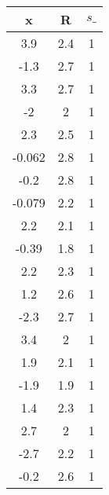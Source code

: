 \begin{tiny}\begin{tabular}{|c|c|c|}
\hline
\textbf{x}&\textbf{R}&\textbf{$s\_$}\\\hline
3.9&2.4&1\\\hline
-1.3&2.7&1\\\hline
3.3&2.7&1\\\hline
-2&2&1\\\hline
2.3&2.5&1\\\hline
-0.062&2.8&1\\\hline
-0.2&2.8&1\\\hline
-0.079&2.2&1\\\hline
2.2&2.1&1\\\hline
-0.39&1.8&1\\\hline
2.2&2.3&1\\\hline
1.2&2.6&1\\\hline
-2.3&2.7&1\\\hline
3.4&2&1\\\hline
1.9&2.1&1\\\hline
-1.9&1.9&1\\\hline
1.4&2.3&1\\\hline
2.7&2&1\\\hline
-2.7&2.2&1\\\hline
-0.2&2.6&1\\\hline
\end{tabular}
\end{tiny}